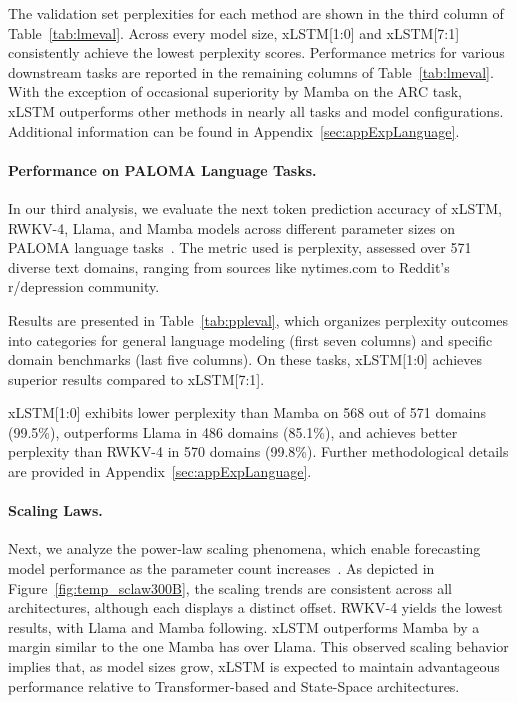 The validation set perplexities for each method are shown in the third column of Table~\ref{tab:lmeval}. Across every model size, xLSTM[1:0] and xLSTM[7:1] consistently achieve the lowest perplexity scores. Performance metrics for various downstream tasks are reported in the remaining columns of Table~\ref{tab:lmeval}. With the exception of occasional superiority by Mamba on the ARC task, xLSTM outperforms other methods in nearly all tasks and model configurations. Additional information can be found in Appendix~\ref{sec:appExpLanguage}.

\paragraph{Performance on PALOMA Language Tasks.} In our third analysis, we evaluate the next token prediction accuracy of xLSTM, RWKV-4, Llama, and Mamba models across different parameter sizes on PALOMA language tasks~\citep{Magnusson:23arxivshort}. The metric used is perplexity, assessed over 571 diverse text domains, ranging from sources like nytimes.com to Reddit's r/depression community.

Results are presented in Table~\ref{tab:ppleval}, which organizes perplexity outcomes into categories for general language modeling (first seven columns) and specific domain benchmarks (last five columns). On these tasks, xLSTM[1:0] achieves superior results compared to xLSTM[7:1].

xLSTM[1:0] exhibits lower perplexity than Mamba on 568 out of 571 domains (99.5\%), outperforms Llama in 486 domains (85.1\%), and achieves better perplexity than RWKV-4 in 570 domains (99.8\%). Further methodological details are provided in Appendix~\ref{sec:appExpLanguage}.

\paragraph{Scaling Laws.} Next, we analyze the power-law scaling phenomena, which enable forecasting model performance as the parameter count increases~\citep{Kaplan:20,Brown:20short}.
As depicted in Figure~\ref{fig:temp_sclaw300B}, the scaling trends are consistent across all architectures, although each displays a distinct offset. RWKV-4 yields the lowest results, with Llama and Mamba following. xLSTM outperforms Mamba by a margin similar to the one Mamba has over Llama. This observed scaling behavior implies that, as model sizes grow, xLSTM is expected to maintain advantageous performance relative to Transformer-based and State-Space architectures.

